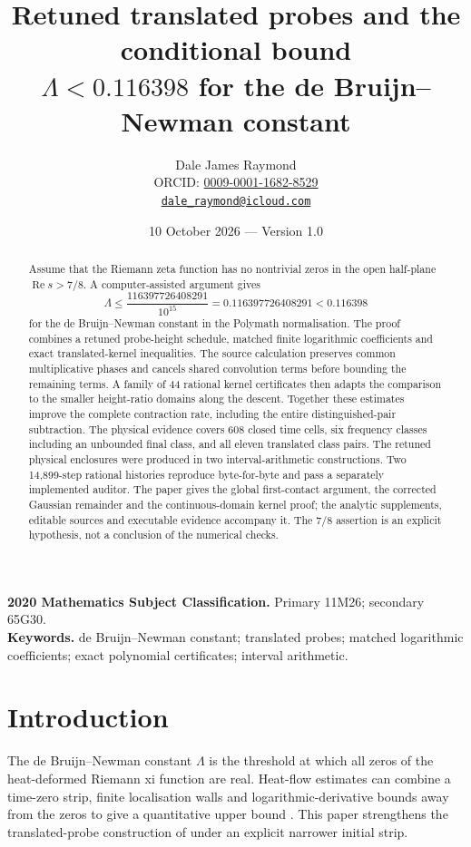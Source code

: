 \documentclass[11pt,a4paper]{article}
\title{Retuned translated probes and the conditional bound\\
$\Lambda<0.116398$ for the de Bruijn--Newman constant}
\author{Dale James Raymond\\[3pt]
\small ORCID: \href{https://orcid.org/0009-0001-1682-8529}{0009-0001-1682-8529}\\
\small \href{mailto:dale_raymond@icloud.com}{\nolinkurl{dale_raymond@icloud.com}}}
\date{10 October 2026 --- Version 1.0}
\theoremstyle{definition}\newtheorem{definition}[theorem]{Definition}
\theoremstyle{remark}\newtheorem{remark}[theorem]{Remark}
\newcommand{\Rea}{\operatorname{Re}}
\begin{document}
\maketitle
\begin{abstract}
Assume that the Riemann zeta function has no nontrivial zeros in the open
half-plane $\Rea s>7/8$. A computer-assisted argument gives
\[
\Lambda\le\frac{116397726408291}{10^{15}}
=0.116397726408291<0.116398
\]
for the de Bruijn--Newman constant in the Polymath normalisation.
The proof combines a retuned probe-height schedule, matched finite
logarithmic coefficients and exact translated-kernel inequalities.
The source calculation preserves common multiplicative phases and cancels
shared convolution terms before bounding the remaining terms. A family of
44 rational kernel certificates then adapts the comparison to the smaller
height-ratio domains along the descent. Together these estimates improve
the complete contraction rate, including the entire distinguished-pair
subtraction. The physical evidence covers 608 closed time cells, six
frequency classes including an unbounded final class, and all eleven
translated class pairs. The retuned physical enclosures were produced in
two interval-arithmetic constructions. Two 14,899-step rational histories
reproduce byte-for-byte and pass a separately implemented auditor.
The paper gives the global first-contact argument, the corrected Gaussian
remainder and the continuous-domain kernel proof; the analytic supplements,
editable sources and executable evidence accompany it. The $7/8$ assertion
is an explicit hypothesis, not a conclusion of the numerical checks.
\end{abstract}
\noindent\textbf{2020 Mathematics Subject Classification.} Primary 11M26; secondary 65G30.\\
\textbf{Keywords.} de Bruijn--Newman constant; translated probes; matched logarithmic
coefficients; exact polynomial certificates; interval arithmetic.

\section{Introduction}\label{sec:introduction}
The de Bruijn--Newman constant $\Lambda$ is the threshold at which all zeros
of the heat-deformed Riemann xi function are real. Heat-flow estimates can
combine a time-zero strip, finite localisation walls and
logarithmic-derivative bounds away from the zeros to give a quantitative
upper bound \cite{polymath,pt}. This paper strengthens the translated-probe
construction of \cite{raymond149} under an explicit narrower initial strip.
\end{document}
